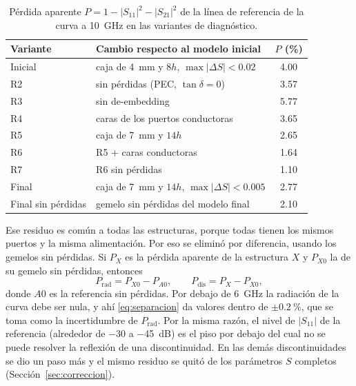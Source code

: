 \begin{table}[htbp]
\centering
\caption{Pérdida aparente $P=1-|S_{11}|^2-|S_{21}|^2$ de la línea de referencia de la curva a \SI{10}{GHz} en las variantes de diagnóstico.}
\label{tab:diag}
\small
\begin{tabular}{llc}
\toprule
Variante & Cambio respecto al modelo inicial & $P$ (\%) \\
\midrule
Inicial & caja de \SI{4}{mm} y $8h$, $\max|\Delta S|<0.02$ & 4.00 \\
R2 & sin pérdidas (PEC, $\tan\delta=0$) & 3.57 \\
R3 & sin de-embedding & 5.77 \\
R4 & caras de los puertos conductoras & 3.65 \\
R5 & caja de \SI{7}{mm} y $14h$ & 2.65 \\
R6 & R5 + caras conductoras & 1.64 \\
R7 & R6 sin pérdidas & 1.10 \\
Final & caja de \SI{7}{mm} y $14h$, $\max|\Delta S|<0.005$ & 2.77 \\
Final sin pérdidas & gemelo sin pérdidas del modelo final & 2.10 \\
\bottomrule
\end{tabular}
\end{table}

Ese residuo es común a todas las estructuras, porque todas tienen los mismos puertos y la misma alimentación. Por eso se eliminó por diferencia, usando los gemelos sin pérdidas. Si $P_X$ es la pérdida aparente de la estructura $X$ y $P_{X0}$ la de su gemelo sin pérdidas, entonces
\begin{equation}
P_{\mathrm{rad}} = P_{X0} - P_{A0}, \qquad P_{\mathrm{dis}} = P_X - P_{X0},
\label{eq:separacion}
\end{equation}
donde $A0$ es la referencia sin pérdidas. Por debajo de \SI{6}{GHz} la radiación de la curva debe ser nula, y ahí \eqref{eq:separacion} da valores dentro de $\pm\SI{0.2}{\percent}$, que se toma como la incertidumbre de $P_{\mathrm{rad}}$. Por la misma razón, el nivel de $|S_{11}|$ de la referencia (alrededor de $-30$ a \SI{-45}{dB}) es el piso por debajo del cual no se puede resolver la reflexión de una discontinuidad. En las demás discontinuidades se dio un paso más y el mismo residuo se quitó de los parámetros $S$ completos (Sección~\ref{sec:correccion}).

